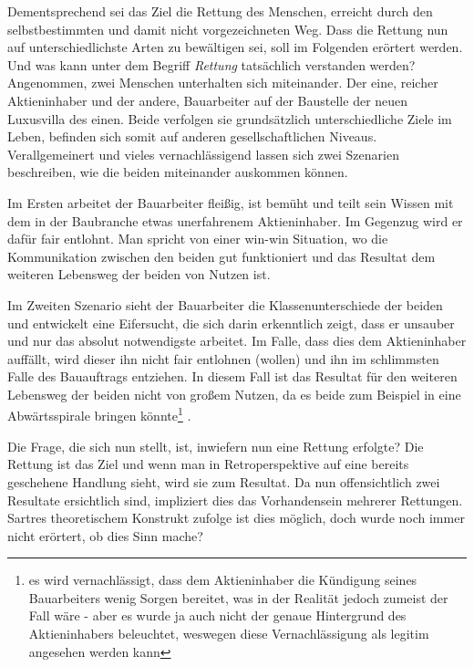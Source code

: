 \documentclass[12pt,a4paper,oneside]{article}
\begin{document}
  Dementsprechend sei das Ziel die Rettung des Menschen, erreicht durch den selbstbestimmten und damit nicht vorgezeichneten Weg. Dass die Rettung nun auf unterschiedlichste Arten zu bewältigen sei, soll im Folgenden erörtert werden. Und was kann unter dem Begriff \textit{Rettung} tatsächlich verstanden werden? \\
  
  Angenommen, zwei Menschen unterhalten sich miteinander. Der eine, reicher Aktieninhaber und der andere, Bauarbeiter auf der Baustelle der neuen Luxusvilla des einen. Beide verfolgen sie grundsätzlich unterschiedliche Ziele im Leben, befinden sich somit auf anderen gesellschaftlichen Niveaus. Verallgemeinert und vieles vernachlässigend lassen sich zwei Szenarien beschreiben, wie die beiden miteinander auskommen können. 
  
  Im Ersten arbeitet der Bauarbeiter fleißig, ist bemüht und teilt sein Wissen mit dem in der Baubranche etwas unerfahrenem Aktieninhaber. Im Gegenzug wird er dafür fair entlohnt. Man spricht von einer win-win Situation, wo die Kommunikation zwischen den beiden gut funktioniert und das Resultat dem weiteren Lebensweg der beiden von Nutzen ist. 
  
  Im Zweiten Szenario sieht der Bauarbeiter die Klassenunterschiede der beiden und entwickelt eine Eifersucht, die sich darin erkenntlich zeigt, dass er unsauber und nur das absolut notwendigste arbeitet. Im Falle, dass dies dem Aktieninhaber auffällt, wird dieser ihn nicht fair entlohnen (wollen) und ihn im schlimmsten Falle des Bauauftrags entziehen. In diesem Fall ist das Resultat für den weiteren Lebensweg der beiden nicht von großem Nutzen, da es beide zum Beispiel in eine Abwärtsspirale bringen könnte\footnote{es wird vernachlässigt, dass dem Aktieninhaber die Kündigung seines Bauarbeiters wenig Sorgen bereitet, was in der Realität jedoch zumeist der Fall wäre - aber es wurde ja auch nicht der genaue Hintergrund des Aktieninhabers beleuchtet, weswegen diese Vernachlässigung als legitim angesehen werden kann} .
  
  Die Frage, die sich nun stellt, ist, inwiefern nun eine Rettung erfolgte? Die Rettung ist das Ziel und wenn man in Retroperspektive auf eine bereits geschehene Handlung sieht, wird sie zum Resultat. Da nun offensichtlich zwei Resultate ersichtlich sind, impliziert dies das Vorhandensein mehrerer Rettungen. Sartres theoretischem Konstrukt zufolge ist dies möglich, doch wurde noch immer nicht erörtert, ob dies Sinn mache? \\
  
\end{document}
